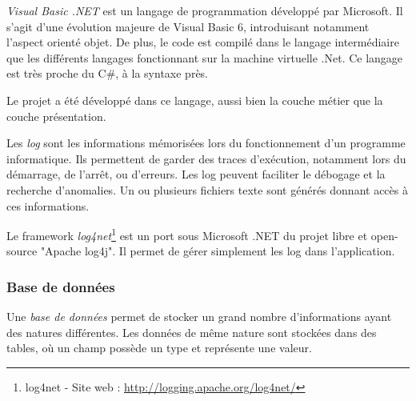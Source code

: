 
\textit{Visual Basic .NET} est un langage de programmation développé par Microsoft.
Il s'agit d'une évolution majeure de Visual Basic 6, introduisant notamment l'aspect orienté objet.
De plus, le code est compilé dans le langage intermédiaire que les différents langages fonctionnant sur la machine virtuelle .Net.
Ce langage est très proche du C\#, à la syntaxe près.

Le projet a été développé dans ce langage, aussi bien la couche métier que la couche présentation.




Les \textit{log} sont les informations mémorisées lors du fonctionnement d'un programme informatique.
Ils permettent de garder des traces d'exécution, notamment lors du démarrage, de l'arrêt, ou d'erreurs.
Les log peuvent faciliter le débogage et la recherche d'anomalies.
Un ou plusieurs fichiers texte sont générés donnant accès à ces informations.

Le framework \textit{log4net}\footnote{log4net - Site web : \url{http://logging.apache.org/log4net/}} est un port sous Microsoft .NET du projet libre et open-source "Apache log4j".
Il permet de gérer simplement les log dans l'application.


\subsubsection{Base de données}

Une \textit{base de données} permet de stocker un grand nombre d'informations ayant des natures différentes.
Les données de même nature sont stockées dans des tables, où un champ possède un type et représente une valeur.



